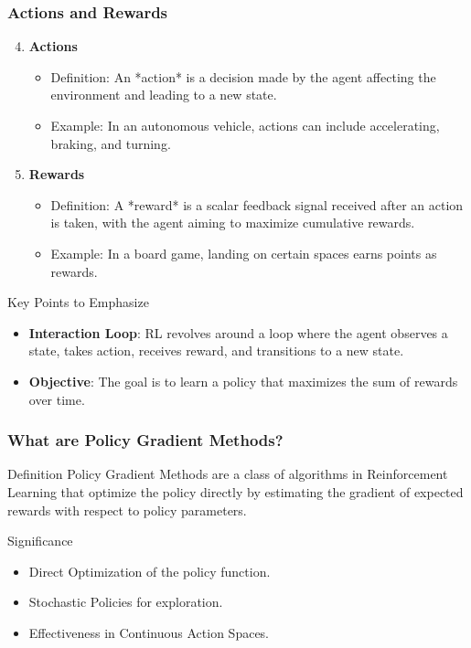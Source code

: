 \documentclass[aspectratio=169]{beamer}
\begin{document}
\begin{frame}[fragile]
    \frametitle{Actions and Rewards}
    \begin{enumerate}
        \setcounter{enumi}{3} %
        \item \textbf{Actions}
            \begin{itemize}
                \item Definition: An *action* is a decision made by the agent affecting the environment and leading to a new state.
                \item Example: In an autonomous vehicle, actions can include accelerating, braking, and turning.
            \end{itemize}
        
        \item \textbf{Rewards}
            \begin{itemize}
                \item Definition: A *reward* is a scalar feedback signal received after an action is taken, with the agent aiming to maximize cumulative rewards.
                \item Example: In a board game, landing on certain spaces earns points as rewards.
            \end{itemize}
    \end{enumerate}
    
    \begin{block}{Key Points to Emphasize}
        \begin{itemize}
            \item \textbf{Interaction Loop}: RL revolves around a loop where the agent observes a state, takes action, receives reward, and transitions to a new state.
            \item \textbf{Objective}: The goal is to learn a policy that maximizes the sum of rewards over time.
        \end{itemize}
    \end{block}
\end{frame}

\begin{frame}[fragile]
    \frametitle{What are Policy Gradient Methods?}
    \begin{block}{Definition}
        Policy Gradient Methods are a class of algorithms in Reinforcement Learning that optimize the policy directly by estimating the gradient of expected rewards with respect to policy parameters.
    \end{block}
    \begin{block}{Significance}
        \begin{itemize}
            \item Direct Optimization of the policy function.
            \item Stochastic Policies for exploration.
            \item Effectiveness in Continuous Action Spaces.
        \end{itemize}
    \end{block}
\end{frame}
\end{document}
